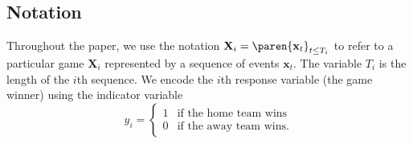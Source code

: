 \subsection{Notation}

Throughout the paper, we use the notation $\mathbf X_i = \paren{\mathbf x_t}_{t \leq T_i}$ to refer to a particular game $\mathbf X_i$ represented by a sequence of events $\mathbf x_t$. The variable $T_i$ is the length of the $i$th sequence. We encode the $i$th response variable (the game winner) using the indicator variable
\begin{equation}
	y_i = \begin{cases}
		1 & \text{if the home team wins}  \\
		0 & \text{if the away team wins}.
	\end{cases}
\end{equation}

